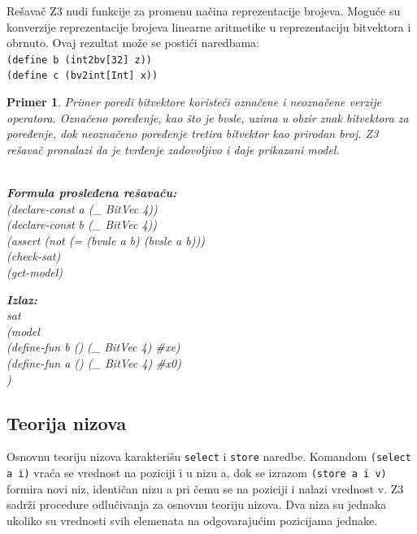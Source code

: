 \documentclass[12pt,oneside]{memoir}
\newcommand\tab[1][0.5cm]{\hspace*{#1}}
\newtheorem{primer}{Primer}
\begin{document}
Rešavač Z3 nudi funkcije za promenu načina reprezentacije brojeva. Moguće su konverzije reprezentacije brojeva linearne aritmetike u reprezentaciju bitvektora i obrnuto. Ovaj rezultat može se postići naredbama: \\
\texttt{(define b (int2bv[32] z))} \\  
\texttt{(define c (bv2int[Int] x))} 
\begin{primer} Primer poredi bitvektore koristeći označene i neoznačene verzije operatora. Označeno poređenje, kao što je bvsle, uzima u obzir znak bitvektora za poređenje, dok neoznačeno poređenje tretira bitvektor kao prirodan broj. Z3 rešavač pronalazi da je tvrđenje zadovoljivo i daje prikazani model.
\\ \\
\begin{minipage}[b]{0.5\textwidth}
\textbf{Formula prosleđena rešavaču:}
\\(declare-const a (\_ BitVec 4))
\\(declare-const b (\_ BitVec 4))
\\(assert (not (= (bvule a b) (bvsle a b)))
\\(check-sat)
\\(get-model)
\end{minipage}
\hspace{1.15cm} 
\begin{minipage}[t]{0.5\textwidth}
\vspace{-3.45cm}
\textbf{Izlaz:}
\\sat 
\\(model 
\\\tab(define-fun b () (\_ BitVec 4) \#xe) 
\\\tab(define-fun a () (\_ BitVec 4) \#x0)
\\)
\end{minipage}


\end{primer}


\subsection{Teorija nizova} 
Osnovnu teoriju nizova karakterišu \texttt{select} i \texttt{store} naredbe. 
Komandom \texttt{(select a i)} vraća se vrednost na poziciji i u nizu a, dok se izrazom \texttt{(store a i v)} formira novi niz, identičan nizu a pri čemu se na poziciji i nalazi vrednost v.
Z3 sadrži procedure odlučivanja za osnovnu teoriju nizova.
Dva niza su jednaka ukoliko su vrednosti svih elemenata na odgovarajućim pozicijama jednake.
 
\end{document}
